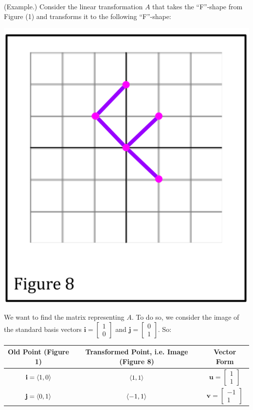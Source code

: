 \documentclass[letterpaper]{article}
\begin{document}
\begin{mdframed}[]
    (Example.) Consider the linear transformation $A$ that takes the ``F''-shape from Figure (1) and transforms it to the following ``F''-shape:
    \begin{center}
        \includegraphics[scale=0.3]{../assets/f6.png}
    \end{center}
    We want to find the matrix representing $A$. To do so, we consider the image of the standard basis vectors $\mathbf{i} = \begin{bmatrix}
        1 \\ 0
    \end{bmatrix}$ and $\mathbf{j} = \begin{bmatrix}
        0 \\ 1
    \end{bmatrix}$. So: 
    \begin{center}
        \begin{tabular}{c|c|c}
            \textbf{Old Point} (Figure 1) & \textbf{Transformed Point, i.e. Image} (Figure 8) & \textbf{Vector Form} \\ 
            \hline 
            $\mathbf{i} = \langle 1, 0 \rangle$ & $\langle 1, 1 \rangle$ & $\mathbf{u} = \begin{bmatrix}
                1 \\ 1
            \end{bmatrix}$ \\ 
            $\mathbf{j} = \langle 0, 1 \rangle$ & $\langle -1, 1 \rangle$ & $\mathbf{v} = \begin{bmatrix}
                -1 \\ 1
            \end{bmatrix}$
        \end{tabular}
    \end{center}


\end{mdframed}
\end{document}
